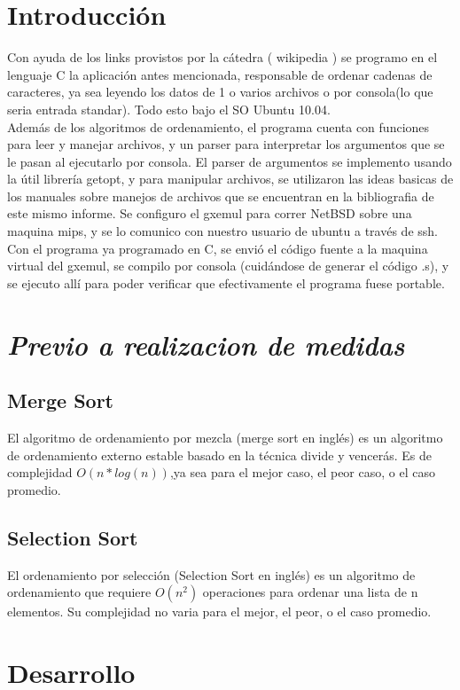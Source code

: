 \section{Introducción}
Con ayuda de los links provistos por la cátedra ( wikipedia ) se programo en el lenguaje C la aplicación antes mencionada, responsable de ordenar cadenas de caracteres, ya sea leyendo los datos de 1 o varios archivos o por consola(lo que seria entrada standar). 
Todo esto bajo el SO Ubuntu 10.04.
\\Además de los algoritmos de ordenamiento, el programa cuenta con funciones para leer y manejar archivos, y un parser para interpretar los argumentos que se le pasan al ejecutarlo por consola.
El parser de argumentos se implemento usando la útil librería getopt, y para manipular archivos, se utilizaron las ideas basicas de los manuales sobre manejos de archivos que se encuentran en la bibliografia de este mismo informe.
Se configuro el gxemul para correr NetBSD sobre una maquina mips, y se lo comunico con nuestro usuario de ubuntu a través de ssh.
\\Con el programa ya programado en C, se envió el código fuente a la maquina virtual del gxemul, se compilo por consola (cuidándose de generar el código .s), y se ejecuto allí para poder verificar que efectivamente el programa fuese portable.

\section{\emph{Previo a realizacion de medidas}}
\subsection{Merge Sort}
El algoritmo de ordenamiento por mezcla (merge sort en inglés) es un algoritmo de ordenamiento externo estable basado en la técnica divide y vencerás.
Es de complejidad $O(n*log(n))$,ya sea para el mejor caso, el peor caso, o el caso promedio.

\subsection{Selection Sort}
El ordenamiento por selección (Selection Sort en inglés) es un algoritmo de ordenamiento que requiere $O(n^2)$ operaciones para ordenar una lista de n elementos.
Su complejidad no varia para el mejor, el peor, o el caso promedio.

\newpage

\section{Desarrollo}
